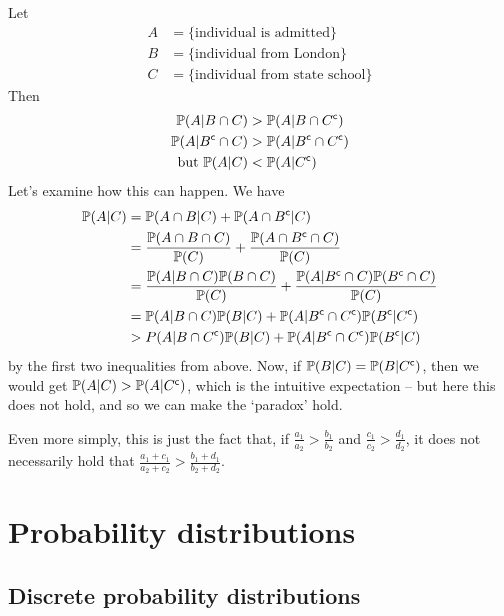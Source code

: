 \documentclass{../../template/note}
\begin{document}
\begin{example*}
        Let 
        \begin{align*}
            A &= \{\text{individual is admitted}\} \\
            B &= \{\text{individual from London}\} \\ 
            C &= \{\text{individual from state school}\}
        \end{align*}
        Then
        \begin{align*}
            \mathbb P(A | B \cap C) &> \mathbb P(A | B \cap C^{\mathsf{c}}) \\
            \mathbb P(A | B^{\mathsf{c}} \cap C) &> \mathbb P(A | B^{\mathsf{c}} \cap C^{\mathsf{c}}) \\
            \text{but } \mathbb P(A | C) &< \mathbb P(A | C^{\mathsf{c}})
        \end{align*}
        Let's examine how this can happen. We have
        \begin{align*}
            \mathbb P(A | C) &= \mathbb P(A \cap B | C) + \mathbb P(A \cap B^{\mathsf{c}} | C) \\
            &= \frac{\mathbb P(A \cap B \cap C)}{\mathbb P(C)} + \frac{\mathbb P(A \cap B^{\mathsf{c}} \cap C)}{\mathbb P(C)} \\
            &= \frac{\mathbb P(A | B \cap C)\mathbb P(B \cap C)}{\mathbb P(C)} + \frac{\mathbb P(A | B^{\mathsf{c}} \cap C)\mathbb P(B^{\mathsf{c}} \cap C)}{\mathbb P(C)} \\
            &= \mathbb P(A | B \cap C)\mathbb P(B | C) + \mathbb P(A | B^{\mathsf{c}} \cap C^{\mathsf{c}})\mathbb P(B^{\mathsf{c}} | C^{\mathsf{c}}) \\
            &> P(A | B \cap C^{\mathsf{c}})\mathbb P(B | C) + \mathbb P(A | B^{\mathsf{c}} \cap C^{\mathsf{c}})\mathbb P(B^{\mathsf{c}} | C)
        \end{align*}
        by the first two inequalities from above. Now, if \(\mathbb P(B | C) = \mathbb P(B | C^{\mathsf{c}})\), then we would get \(\mathbb P(A | C) > \mathbb P(A | C^{\mathsf{c}})\), which is the intuitive expectation -- but here this does not hold, and so we can make the `paradox' hold.

        Even more simply, this is just the fact that, if \(\frac{a_1}{a_2} > \frac{b_1}{b_2}\) and \(\frac{c_1}{c_2} > \frac{d_1}{d_2}\), it does not necessarily hold that \(\frac{a_1+c_1}{a_2+c_2} > \frac{b_1+d_1}{b_2+d_2}\).       
    \end{example*}
    
    \section{Probability distributions}

    \subsection{Discrete probability distributions}
\end{document}
